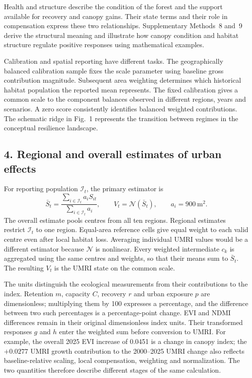 Health and structure describe the condition of the forest and the support available for recovery and canopy gains. Their state terms and their role in compensation express these two relationships. Supplementary Methods~8 and~9 derive the structural meaning and illustrate how canopy condition and habitat structure regulate positive responses using mathematical examples.

Calibration and spatial reporting have different tasks. The geographically balanced calibration sample fixes the scale parameter using baseline gross contribution magnitude. Subsequent area weighting determines which historical habitat population the reported mean represents. The fixed calibration gives a common scale to the component balances observed in different regions, years and scenarios. A zero score consistently identifies balanced weighted contributions. The schematic ridge in Fig.~1 represents the transition between regimes in the conceptual resilience landscape.

\subsection{4. Regional and overall estimates of urban effects}

For reporting population $\mathcal{I}_t$, the primary estimator is
\begin{equation}\label{eq:si_primary}
\bar S_t=\frac{\sum_{i\in\mathcal{I}_t}a_iS_{it}}{\sum_{i\in\mathcal{I}_t}a_i},
\qquad V_t=\mathcal{N}(\bar S_t),\qquad a_i=900~\mathrm{m}^2.
\end{equation}
The overall estimate pools centres from all ten regions. Regional estimates restrict $\mathcal{I}_t$ to one region. Equal-area reference cells give equal weight to each valid centre even after local habitat loss. Averaging individual UMRI values would be a different estimator because $\mathcal{N}$ is nonlinear. Every weighted intermediate $c_k$ is aggregated using the same centres and weights, so that their means sum to $\bar S_t$. The resulting $V_t$ is the UMRI state on the common scale.

The units distinguish the ecological measurements from their contributions to the index. Retention $m$, capacity $C$, recovery $r$ and urban exposure $p$ are dimensionless; multiplying them by 100 expresses a percentage, and the difference between two such percentages is a percentage-point change. EVI and NDMI differences remain in their original dimensionless index units. Their transformed responses $g$ and $h$ enter the weighted sum before conversion to UMRI. For example, the overall 2025 EVI increase of 0.0451 is a change in canopy index; the $+0.0277$ UMRI growth contribution to the 2000--2025 UMRI change also reflects baseline-relative scaling, local compensation, weighting and normalization. The two quantities therefore describe different stages of the same calculation.

